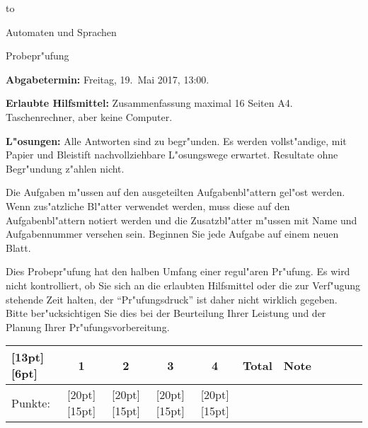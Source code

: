 %
%
%


\phantom{a}
\vspace{0.8cm}
{\parindent0pt\hbox to}
\vspace{1.5cm}

\begin{center}
{\LARGE Automaten und Sprachen}

\vspace{0.5cm}
{\Large Probepr"ufung}

\vspace{1.5cm}
\end{center}

{\parindent 0pt
{\bf Abgabetermin:}
Freitag, 19.~Mai 2017, 13:00.
\smallskip

{\bf Erlaubte Hilfsmittel:} Zusammenfassung maximal 16 Seiten A4.
Taschenrechner, aber keine Computer.
\smallskip

{\bf L"osungen:} Alle Antworten sind zu begr"unden.
Es werden vollst"andige, mit Papier und Bleistift
nachvollziehbare L"o\-sungs\-wege erwartet. Resultate ohne Begr"undung
z"ahlen nicht.

Die Aufgaben m"ussen
auf den ausgeteilten Aufgabenbl"attern gel"ost werden. Wenn zus"atzliche
Bl"atter verwendet werden, muss diese auf den Aufgabenbl"attern notiert
werden und die Zusatzbl"atter m"ussen mit Name und Aufgabennummer versehen
sein. Beginnen Sie jede Aufgabe auf einem neuen Blatt.

Dies Probepr"ufung hat den halben Umfang einer regul"aren Pr"ufung.
Es wird nicht kontrolliert, ob Sie sich an die erlaubten Hilfsmittel
oder die zur Verf"ugung stehende Zeit halten, der ``Pr"ufungsdruck'' ist
daher nicht wirklich gegeben.
Bitte ber"ucksichtigen Sie dies bei der Beurteilung Ihrer Leistung
und der Planung Ihrer Pr"ufungsvorbereitung.
}

\vspace{1cm}

\begin{center}
\begin{tabular}{|l|c|c|c|c|c|c|c|c|c|c|}
\hline
\raisebox{0pt}[13pt][6pt]{\phantom{XX}}&1&2&3&4&Total&Note\\
\hline
Punkte:&
\raisebox{0pt}[20pt][15pt]{\phantom{XX}}&
\raisebox{0pt}[20pt][15pt]{\phantom{XX}}&
\raisebox{0pt}[20pt][15pt]{\phantom{XX}}&
\raisebox{0pt}[20pt][15pt]{\phantom{XX}}&\phantom{XXX}&\phantom{XXXX}\\
\hline
\end{tabular}
\end{center}


\pagebreak
\keineloesungen




